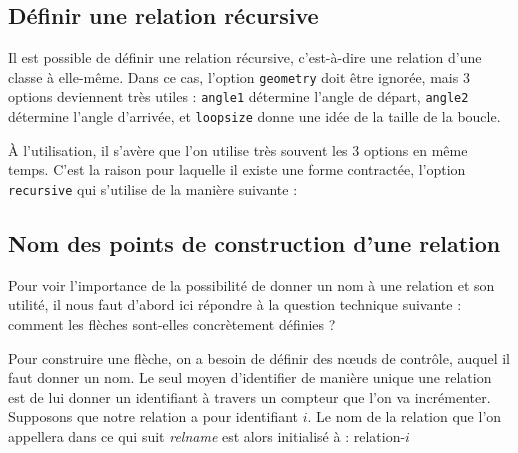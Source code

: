\documentclass[a4paper,11pt]{report}
\newcommand{\inputTikZ}[1]{%
  }%
\newcommand{\inputTikZ}[1]{%
    \texttt{[image: fig/\#1.pdf]}%
  }%
\begin{document}
\subsection{Définir une relation récursive}\label{ss.relrec}

Il est possible de définir une relation récursive, c'est-à-dire une relation d'une classe à elle-même. Dans ce cas, l'option {\tt geometry} doit être ignorée, mais 3 options deviennent très utiles : {\tt angle1} détermine l'angle de départ, {\tt angle2} détermine l'angle d'arrivée, et {\tt loopsize} donne une idée de la taille de la boucle.

\medskip

\begin{minipage}{0.5\textwidth}

\end{minipage}
\begin{minipage}{0.4\textwidth}
\begin{center}
\inputTikZ{relationrec}
\end{center}
\end{minipage}

\medskip

\`{A} l'utilisation, il s'avère que l'on utilise très souvent les 3 options en même temps. C'est la raison pour laquelle il existe une forme contractée, l'option {\tt recursive} qui s'utilise de la manière suivante :

\medskip

\begin{minipage}{0.5\textwidth}

\end{minipage}
\begin{minipage}{0.4\textwidth}
\begin{center}
\inputTikZ{relationrec2}
\end{center}
\end{minipage}

\subsection{Nom des points de construction d'une relation}\label{ss.relptname}

Pour voir l'importance de la possibilité de donner un nom à une relation et son utilité, il nous faut d'abord ici répondre à la question technique suivante : comment les flèches sont-elles concrètement définies ?

Pour construire une flèche, on a besoin de définir des n\oe{}uds de contrôle, auquel il faut donner un nom. Le seul moyen d'identifier de manière unique une relation est de lui donner un identifiant à travers un compteur que l'on va incrémenter. Supposons que notre relation a pour identifiant $i$. Le nom de la relation que l'on appellera dans ce qui suit {\it relname} est alors initialisé à : relation-$i$
\end{document}
